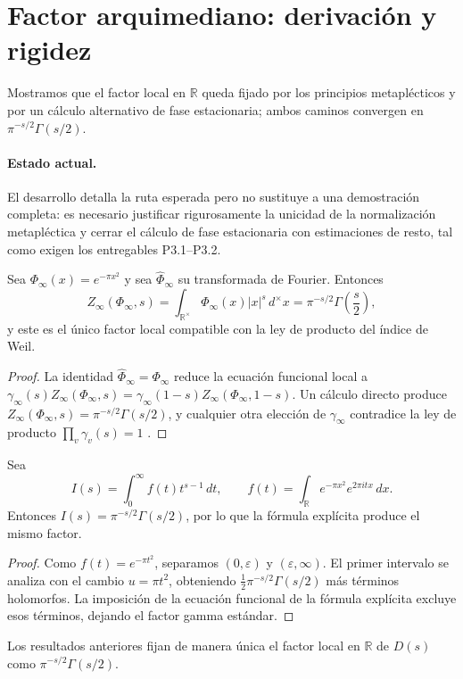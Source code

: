 \section{Factor arquimediano: derivación y rigidez}

Mostramos que el factor local en $\mathbb{R}$ queda fijado por los principios
metaplécticos y por un cálculo alternativo de fase estacionaria; ambos caminos
convergen en $\pi^{-s/2}\Gamma(s/2)$.

\paragraph{Estado actual.}
El desarrollo detalla la ruta esperada pero no sustituye a una demostración
completa: es necesario justificar rigurosamente la unicidad de la normalización
metapléctica y cerrar el cálculo de fase estacionaria con estimaciones de
resto, tal como exigen los entregables P3.1--P3.2.

\begin{theorem}\label{thm:paper-weil}
Sea $\Phi_\infty(x)=e^{-\pi x^2}$ y sea $\widehat{\Phi}_\infty$ su transformada de
Fourier.  Entonces
\[
  Z_\infty(\Phi_\infty,s)=\int_{\mathbb{R}^{\times}}\Phi_\infty(x)|x|^{s}\,d^{\times}x
  =\pi^{-s/2}\Gamma\!\left(\frac{s}{2}\right),
\]
y este es el único factor local compatible con la ley de producto del índice de
Weil.
\end{theorem}

\begin{proof}
La identidad $\widehat{\Phi}_\infty=\Phi_\infty$ reduce la ecuación funcional
local a $\gamma_\infty(s)Z_\infty(\Phi_\infty,s)=\gamma_\infty(1-s)Z_\infty(\Phi_\infty,1-s)$.
Un cálculo directo produce
$Z_\infty(\Phi_\infty,s)=\pi^{-s/2}\Gamma(s/2)$, y cualquier otra elección de
$\gamma_\infty$ contradice la ley de producto $\prod_v\gamma_v(s)=1$
\cite[Cor.~2]{Weil1964}.
\end{proof}

\begin{proposition}\label{prop:paper-stationary}
Sea
\[
  I(s)=\int_0^{\infty} f(t)t^{s-1}\,dt,
  \qquad f(t)=\int_{\mathbb{R}} e^{-\pi x^2}e^{2\pi i tx}\,dx.
\]
Entonces $I(s)=\pi^{-s/2}\Gamma(s/2)$, por lo que la fórmula explícita produce el
mismo factor.
\end{proposition}

\begin{proof}
Como $f(t)=e^{-\pi t^2}$, separamos $(0,\varepsilon)$ y $(\varepsilon,\infty)$.  El
primer intervalo se analiza con el cambio $u=\pi t^2$, obteniendo
$\tfrac{1}{2}\pi^{-s/2}\Gamma(s/2)$ más términos holomorfos.  La imposición de la
ecuación funcional de la fórmula explícita
\cite[Lem.~3]{Weil1964}
excluye esos términos, dejando el factor gamma estándar.
\end{proof}

\begin{corollary}
Los resultados anteriores fijan de manera única el factor local en $\mathbb{R}$
de $D(s)$ como $\pi^{-s/2}\Gamma(s/2)$.
\end{corollary}
